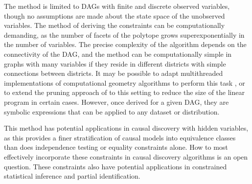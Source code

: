 \documentclass[12pt]{article}
\begin{document}
The method is limited to DAGs with finite and discrete observed variables, though no assumptions are made about the state space of the unobserved variables. The method of deriving the constraints can be computationally demanding, as the number of facets of the polytope grows superexponentially in the number of variables. The precise complexity of the algorithm depends on the connectivity of the DAG, and the method can be computationally simple in graphs with many variables if they reside in different districts with simple connections between districts. It may be possible to adapt multithreaded implementations of computational geometry algorithms to perform this task \citep{Normaliz}, or to extend the pruning approach of \citet{shridharan2023scalable} to this setting to reduce the size of the linear program in certain cases. However, once derived for a given DAG, they are symbolic expressions that can be applied to any dataset or distribution. 

This method has potential applications in causal discovery with hidden variables, as this provides a finer stratification of causal models into equivalence classes than does independence testing or equality constraints alone. How to most effectively incorporate these constraints in causal discovery algorithms is an open question. These constraints also have potential applications in constrained statistical inference and partial identification.






\end{document}
